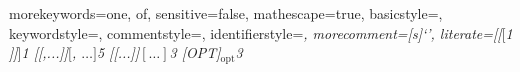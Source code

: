   {
    morekeywords={one, of},
    sensitive=false,
    mathescape=true,
    basicstyle=\footnotesize\ttfamily,
    keywordstyle=\footnotesize\ttfamily,
    commentstyle=\footnotesize\ttfamily,
    identifierstyle=\footnotesize\itshape,
    morecomment=[s]{`}{'},
    literate={[[}{{$[$}}{1}
             {]]}{{$]$}}{1}
             {[[,...]]}{{$[$, $\ldots]$}}{5}
             {[[...]]}{{$[\ldots]$}}{3}
             {[OPT]}{{$_{\mbox{opt}}$}}{3}
  }


\newcommand{\sntx}[1]{\lstinline[language=syntax,basicstyle=\normalsize\tt,identifierstyle=\normalsize\it]!#1!}
